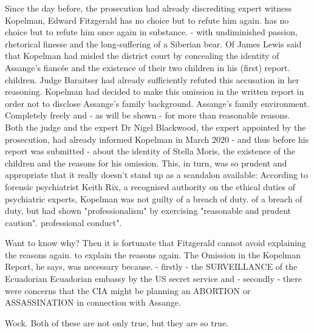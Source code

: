 \begin{multicols}{2}
Since the day before, the prosecution had already
discrediting expert witness Kopelman, Edward Fitzgerald has no choice but to refute him again.
has no choice but to refute him once again in substance.
- with undiminished passion, rhetorical finesse
and the long-suffering of a Siberian bear. Of James
Lewis said that Kopelman had misled the district court by concealing the identity of Assange's fiancée and the existence of their two children in his (first) report.
children. Judge Baraitser had already sufficiently refuted this accusation in her reasoning.
Kopelman had decided to make this omission in the written report in order not to disclose Assange's family background.
Assange's family environment. Completely
freely and - as will be shown - for more than reasonable reasons. Both the judge and the expert
Dr Nigel Blackwood, the expert appointed by the prosecution, had already informed Kopelman in March 2020 - and thus before his report was submitted - about the identity of Stella
Moris, the existence of the children and the reasons for his
omission. This, in turn, was so prudent
and appropriate that it really doesn't stand up as a scandalon
available: According to forensic psychiatrist Keith Rix, a recognised authority on the
ethical duties of psychiatric experts, Kopelman was not guilty of a breach of duty.
of a breach of duty, but had shown "professionalism" by exercising "reasonable and prudent caution".
professional conduct".

Want to know why? Then it is fortunate that
Fitzgerald cannot avoid explaining the reasons again.
to explain the reasons again. The Omission in the Kopelman Report, he says, was necessary because.
- firstly - the SURVEILLANCE of the Ecuadorian
Ecuadorian embassy by the US secret service
and - secondly - there were concerns that the
CIA might be planning an ABORTION or ASSASSINATION in connection with Assange.

Wock. Both of these are not only true, but they are so true.




\end{multicols}
